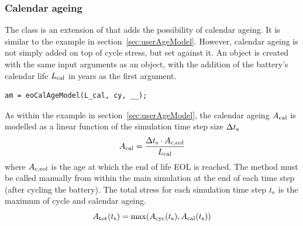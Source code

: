 \subsubsection{Calendar ageing}
The  class is an extension of  that adds the possibility of calendar ageing. It is similar to the example in section~\ref{sec:userAgeModel}. However, calendar ageing is not simply added on top of cycle stress, but set against it. An  object is created with the same input arguments as an  object, with the addition of the battery's calendar life $L_\text{cal}$ in years as the first argument.
\begin{lstlisting}
am = eoCalAgeModel(L_cal, cy, __);
\end{lstlisting}
As within the example in section~\ref{sec:userAgeModel}, the calendar ageing $A_\text{cal}$ is modelled as a linear function of the simulation time step size $\Delta t_\text{s}$
\begin{equation}
A_\text{cal} = \frac{\Delta t_\text{s}\cdot A_\text{c,eol}}{L_\text{cal}}
\end{equation}
where $A_\text{c,eol}$ is the age at which the end of life EOL is reached. The  method must be called manually from within the main simulation at the end of each time step (after cycling the battery). The total stress for each simulation time step $t_\text{s}$ is the maximum of cycle and calendar ageing.
\begin{equation}
A_\text{tot}(t_\text{s}) = \max(A_\text{cyc}(t_\text{s}), A_\text{cal}(t_\text{s}))
\end{equation}
